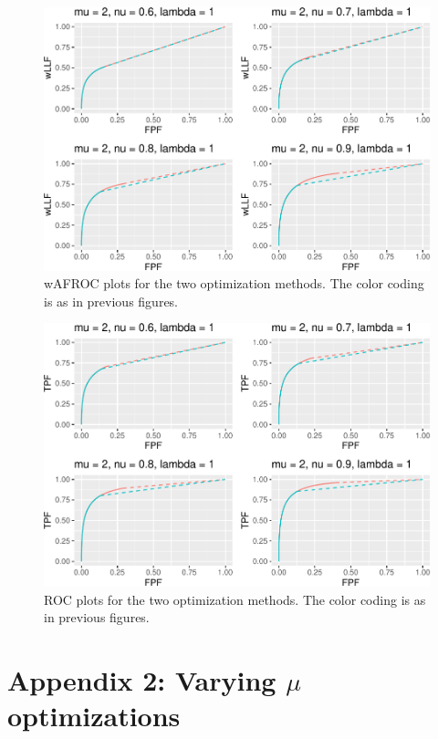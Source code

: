 \documentclass[
]{book}
\begin{document}
\begin{figure}
\centering
\includegraphics{21-optim-op-point_files/figure-latex/optim-op-point-vary-nu-wafroc-1.pdf}
\caption{\label{fig:optim-op-point-vary-nu-wafroc}wAFROC plots for the two optimization methods. The color coding is as in previous figures.}
\end{figure}

\begin{figure}
\centering
\includegraphics{21-optim-op-point_files/figure-latex/optim-op-point-vary-nu-roc-1.pdf}
\caption{\label{fig:optim-op-point-vary-nu-roc}ROC plots for the two optimization methods. The color coding is as in previous figures.}
\end{figure}

\hypertarget{optim-op-point-vary-mu}{%
\section{\texorpdfstring{Appendix 2: Varying \(\mu\) optimizations}{Appendix 2: Varying \textbackslash mu optimizations}}\label{optim-op-point-vary-mu}}
\end{document}
